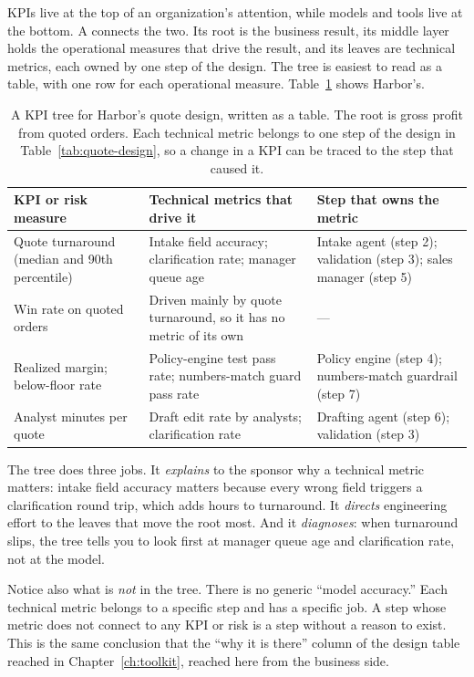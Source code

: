 KPIs live at the top of an organization's attention, while models and tools live at the bottom. A  connects the two. Its root is the business result, its middle layer holds the operational measures that drive the result, and its leaves are technical metrics, each owned by one step of the design. The tree is easiest to read as a table, with one row for each operational measure. Table~\ref{tab:kpi-tree} shows Harbor's.

\begin{table}[htbp]
\centering
\small
\caption{A KPI tree for Harbor's quote design, written as a table. The root is gross profit from quoted orders. Each technical metric belongs to one step of the design in Table~\ref{tab:quote-design}, so a change in a KPI can be traced to the step that caused it.}
\label{tab:kpi-tree}
\begin{tabularx}{\textwidth}{@{}>{\raggedright\arraybackslash}p{3.6cm}>{\raggedright\arraybackslash}X>{\raggedright\arraybackslash}p{3.6cm}@{}}
\toprule
\rowcolor{coHead} KPI or risk measure & Technical metrics that drive it & Step that owns the metric \\
\midrule
Quote turnaround (median and 90th percentile) & Intake field accuracy; clarification rate; manager queue age & Intake agent (step 2); validation (step 3); sales manager (step 5) \\
Win rate on quoted orders & Driven mainly by quote turnaround, so it has no metric of its own & --- \\
Realized margin; below-floor rate & Policy-engine test pass rate; numbers-match guard pass rate & Policy engine (step 4); numbers-match guardrail (step 7) \\
Analyst minutes per quote & Draft edit rate by analysts; clarification rate & Drafting agent (step 6); validation (step 3) \\
\bottomrule
\end{tabularx}
\end{table}

The tree does three jobs. It \emph{explains} to the sponsor why a technical metric matters: intake field accuracy matters because every wrong field triggers a clarification round trip, which adds hours to turnaround. It \emph{directs} engineering effort to the leaves that move the root most. And it \emph{diagnoses}: when turnaround slips, the tree tells you to look first at manager queue age and clarification rate, not at the model.

Notice also what is \emph{not} in the tree. There is no generic ``model accuracy.'' Each technical metric belongs to a specific step and has a specific job. A step whose metric does not connect to any KPI or risk is a step without a reason to exist. This is the same conclusion that the ``why it is there'' column of the design table reached in Chapter~\ref{ch:toolkit}, reached here from the business side.
